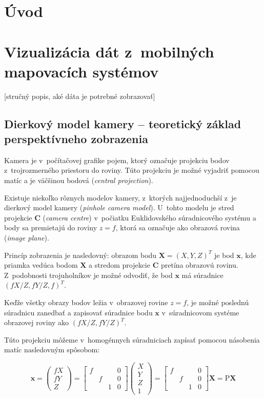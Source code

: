 %

\chapter{Úvod}

\chapter{Vizualizácia dát z~mobilných mapovacích systémov}

[stručný popis, aké dáta je potrebné zobrazovať]

\section{Dierkový model kamery -- teoretický základ perspektívneho zobrazenia}

Kamera je v~počítačovej grafike pojem, ktorý označuje projekciu bodov z~trojrozmerného priestoru do roviny. Túto projekciu je možné vyjadriť pomocou matíc a je väčšinou bodová (\emph{central projection}).

Existuje niekoľko rôznych modelov kamery, z~ktorých najjednoduchší z~je dierkový model kamery (\emph{pinhole camera model}). U~tohto modelu je stred projekcie $\mathbf{C}$  (\emph{camera centre}) v~počiatku Euklidovského súradnicového systému a body sa premietajú do roviny $z = f$, ktorá sa označuje ako obrazová rovina (\emph{image plane}).

Princíp zobrazenia je nasledovný: obrazom bodu $\mathbf{X} = (X, Y, Z)^T$ je bod $\mathbf{x}$, kde priamka vedúca bodom $\mathbf{X}$ a stredom projekcie $\mathbf{C}$ pretína obrazovú rovinu. Z~podobnosti trojuholníkov je možné odvodiť, že bod $\mathbf{x}$ má súradnice $(fX/Z, fY/Z, f)^T$.

Keďže všetky obrazy bodov ležia v~obrazovej rovine $z = f$, je možné poslednú súradnicu zanedbať a zapisovať súradnice bodu $\mathbf{x}$ v~súradnicovom systéme obrazovej roviny ako $(fX/Z, fY/Z)^T$.

Túto projekciu môžeme v~homogénnych súradniciach zapísať pomocou násobenia matíc nasledovným spôsobom:

$$ \mathbf{x} 
=
\begin{pmatrix}
fX \\
fY \\
Z
\end{pmatrix}
=
\begin{bmatrix}
f &   &   & 0 \\
  & f &   & 0 \\
  &   & 1 & 0
\end{bmatrix}
\begin{pmatrix}
X \\
Y \\
Z \\
1
\end{pmatrix}
=
\begin{bmatrix}
f &   &   & 0 \\
  & f &   & 0 \\
  &   & 1 & 0
\end{bmatrix}
\mathbf{X}
=
\mathrm{P} \mathbf{X}
$$

